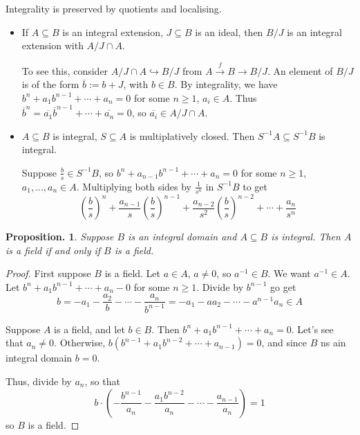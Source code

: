 \documentclass[11pt, a4paper]{memoir}
\newcommand{\fto}[1]{\ensuremath{\xrightarrow{\scriptstyle{#1}}}}
\theoremstyle{change}
\newtheorem{proposition}[theorem]{Proposition.}
\theoremstyle{plain}
\theoremstyle{nonumberplain}
\newtheorem{proof}{Proof}
\numberwithin{equation}{section}
\begin{document}
Integrality is preserved by quotients and localising.
\begin{itemize}[nl]
    \item If $A\subseteq B$ is an integral extension, $J\subseteq B$ is an ideal, then $B/J$ is an integral extension with $A/J\cap A$.

        To see this, consider $A/J\cap A\hookrightarrow B/J$ from $A\fto{f} B\to B/J$.
        An element of $B/J$ is of the form $\overline{b}:= b+J$, with $b\in B$.
        By integrality, we have $b^n+a_1b^{n-1}+\cdots+a_n=0$ for some $n\geq 1$, $a_i\in A$.
        Thus $\overline{b}^n=\overline{a_1}\overline{b}^{n-1}+\cdots+\overline{a_n}=0$, so $\overline{a_i}\in A/J\cap A$.
    \item $A\subseteq B$ is integral, $S\subseteq A$ is multiplatively closed.
        Then $S^{-1}A\subseteq S^{-1}B$ is integral.

        Suppose $\frac{b}{s}\in S^{-1}B$, so $b^n+a_{n-1}b^{n-1}+\cdots+a_n=0$ for some $n\geq 1$, $a_1,\ldots,a_n\in A$.
        Multiplying both sides by $\frac{1}{s^n}$ in $S^{-1}B$ to get
        \begin{equation*}
            \left(\frac{b}{s}\right)^n+\frac{a_{n-1}}{s}\left(\frac{b}{s}\right)^{n-1}+\frac{a_{n-2}}{s^2}\left(\frac{b}{s}\right)^{n-2}+\cdots+\frac{a_n}{s^n}
        \end{equation*}
\end{itemize}
\begin{proposition}
    Suppose $B$ is an integral domain and $A\subseteq B$ is integral.
    Then $A$ is a field if and only if $B$ is a field.
\end{proposition}
\begin{proof}
    First suppose $B$ is a field.
    Let $a\in A$, $a\neq 0$, so $a^{-1}\in B$.
    We want $a^{-1}\in A$.
    Let $b^n+a_1b^{n-1}+\cdots+a_n-0$ for some $n\geq 1$.
    Divide by $b^{n-1}$ go get
    \begin{equation*}
        b=-a_1-\frac{a_2}{b}-\cdots-\frac{a_n}{b^{n-1}}=-a_1-aa_2-\cdots-a^{n-1}a_n\in A
    \end{equation*}

    Suppose $A$ is a field, and let $b\in B$.
    Then $b^n+a_1b^{n-1}+\cdots+a_n=0$.
    Let's see that $a_n\neq 0$.
    Otherwise, $b(b^{n-1}+a_1b^{n-2}+\cdots+a_{n-1})=0$, and since $B$ ns ain integral domain $b=0$.

    Thus, divide by $a_n$, so that
    \begin{equation*}
        b\cdot\left(-\frac{b^{n-1}}{a_n}-\frac{a_1b^{n-2}}{a_n}-\cdots-\frac{a_{n-1}}{a_n}\right)=1
    \end{equation*}
    so $B$ is a field.
\end{proof}
\end{document}
